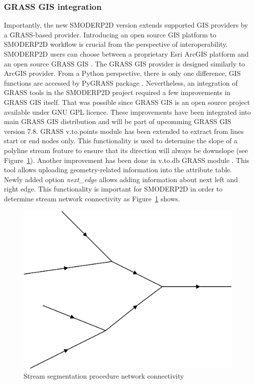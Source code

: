 \subsubsection{GRASS GIS integration}\label{sec:grass_provider}
Importantly, the new SMODERP2D version extends supported GIS providers
by a GRASS-based provider. Introducing an open source GIS platform to
SMODERP2D workflow is crucial from the perspective of
interoperability. SMODERP2D users can choose between a proprietary
Esri ArcGIS platform and an open source GRASS GIS
\cite{neteler2012grass}. The GRASS GIS provider is designed similarly
to ArcGIS provider. From a Python perspective, there is only one
difference, GIS functions are accessed by PyGRASS package
\cite{ijgi2010201}. Nevertheless, an integration of GRASS tools in the
SMODERP2D project required a few improvements in GRASS GIS
itself. That was possible since GRASS GIS is an open source project
available under GNU GPL licence. These improvements have been
integrated into main GRASS GIS distribution and will be part of
upcomming GRASS GIS version 7.8.  GRASS v.to.points module
\cite{v-to-points-2019} has been extended to extract from lines start
or end nodes only. This functionality is used to determine the slope
of a polyline stream feature to ensure that its direction will always
be downslope (see Figure~\ref{fig:stream_next_edge}). Another
improvement has been done in v.to.db GRASS module
\cite{v-to-db-2019}. This tool allows uploading geometry-related
information into the attribute table. Newly added option {\it
  next\_edge} allows adding information about next left and right
edge. This functionality is important for SMODERP2D in order to
determine stream network connectivity as
Figure~\ref{fig:stream_next_edge} shows.

\begin{figure}[ht!]
  \begin{center}
    \includegraphics[width=0.6\columnwidth]{figures/stream_next_edge}
    \caption{Stream segmentation procedure network connectivity}
    \label{fig:stream_next_edge}
  \end{center}
\end{figure}

